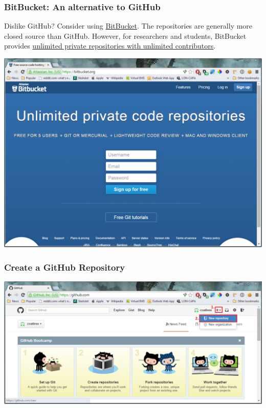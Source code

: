 \documentclass{beamer}\usepackage[]{graphicx}\usepackage[]{color}
\begin{document}
\begin{frame}
\frametitle{BitBucket: An alternative to GitHub}

Dislike GitHub? Consider using \href{https://bitbucket.org/}{BitBucket}. The repositories are generally more closed source than GitHub. However, for researchers and students, BitBucket provides \href{https://www.atlassian.com/software/views/bitbucket-academic-license.jsp}{unlimited private repositories with unlimited contributors}.
\begin{center}
\includegraphics[scale=0.25]{img/git/bitbucket_reg.png}
\end{center}

\end{frame}


\begin{frame}
\frametitle{Create a GitHub Repository}

\begin{center}
\includegraphics[scale=0.41]{img/git/create_repo.png}
\end{center}

\end{frame}
\end{document}
